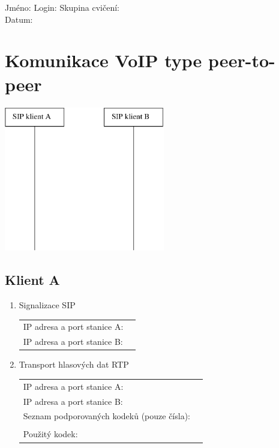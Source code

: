 Jméno: \hspace{4cm} Login: \hspace{4cm} Skupina cvičení:\\
Datum:

\section{Komunikace VoIP type peer-to-peer}
\begin{multicols}{2}
  \begin{center}
    \includegraphics[width=70mm]{peer-to-peer.eps}
  \end{center}
  \columnbreak
  \subsection*{Klient A}      
  \begin{enumerate}
    \item Signalizace SIP
    
    \begin{tabular}{lp{2cm}}
      IP adresa a port stanice A: &\\
      IP adresa a port stanice B: &\\
    \end{tabular}               
   
    \item Transport hlasových dat RTP
    
    \begin{tabular}{lp{2cm}}
      IP adresa a port stanice A: &\\
      IP adresa a port stanice B: &\\
      Seznam podporovaných kodeků (pouze čísla):&\\
      &\\
      Použitý kodek: &\\
    \end{tabular}               
  \end{enumerate}      
\end{multicols}

